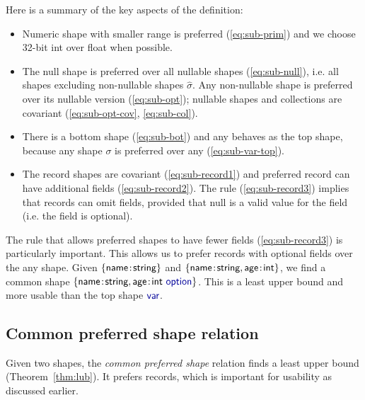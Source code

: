 \documentclass[10pt,preprint,blind,clearpagebib]{sigplanconf}
\newcommand{\kvd}[1]{\textnormal{\textcolor{kvdclr}{\sffamily #1}}}
\newcommand{\ident}[1]{\textnormal{\sffamily #1}}
\begin{document}


\noindent
Here is a summary of the key aspects of the definition:
\begin{itemize}
\item Numeric shape with smaller range is preferred (\ref{eq:sub-prim}) and we choose 32-bit 
\ident{int} over \ident{float} when possible.

\item The \kvd{null} shape is preferred over all nullable shapes (\ref{eq:sub-null}), i.e. 
  all shapes excluding non-nullable shapes $\hat{\sigma}$. Any non-nullable shape is preferred
  over its nullable version (\ref{eq:sub-opt}); nullable shapes and collections are 
  covariant (\ref{eq:sub-opt-cov}, \ref{eq:sub-col}).

\item There is a bottom shape (\ref{eq:sub-bot}) and \kvd{any} behaves as the top shape, because
  any shape $\sigma$ is preferred over \kvd{any} (\ref{eq:sub-var-top}). 

\item The record shapes are covariant (\ref{eq:sub-record1}) and preferred record can have 
  additional fields (\ref{eq:sub-record2}). The rule (\ref{eq:sub-record3}) implies that records 
  can omit fields, provided that \kvd{null} is a valid value for the 
  field (i.e. the field is optional).
\end{itemize}

\noindent
The rule that allows preferred shapes to have fewer fields (\ref{eq:sub-record3}) is particularly
important. This allows us to prefer records with optional fields over the \kvd{any} 
shape. Given $\{ \ident{name}\!:\!\ident{string} \}$ and $\{ \ident{name}\!:\!\ident{string}, \ident{age}\!:\!\ident{int} \}$,
we find a common shape $\{ \ident{name}\!:\!\ident{string}, \ident{age}\!:\!\ident{int}~\kvd{option} \}$.
This is a least upper bound and more usable than the top shape $\kvd{var}$.


\subsection{Common preferred shape relation}
\label{sec:inference-commonsuper}

Given two shapes, the \emph{common preferred shape} relation finds a least upper bound
(Theorem~\ref{thm:lub}). It prefers records, which is important for usability as discussed
earlier.
\end{document}
